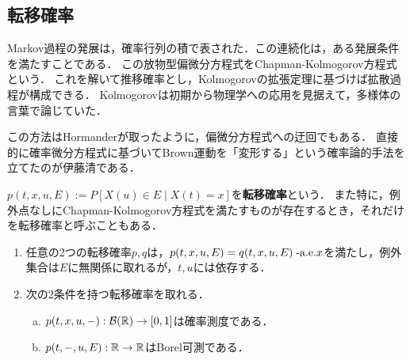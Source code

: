 \documentclass[uplatex,dvipdfmx]{jsreport}
\begin{document}
\subsection{転移確率}

\begin{tcolorbox}[colframe=ForestGreen, colback=ForestGreen!10!white,breakable,colbacktitle=ForestGreen!40!white,coltitle=black,fonttitle=\bfseries\sffamily,
title=熱核の半群性]
    Markov過程の発展は，確率行列の積で表された．この連続化は，ある発展条件を満たすことである．
    この放物型偏微分方程式をChapman-Kolmogorov方程式という．
    これを解いて推移確率とし，Kolmogorovの拡張定理に基づけば拡散過程が構成できる．
    Kolmogorovは初期から物理学への応用を見据えて，多様体の言葉で論じていた．

    この方法はHormanderが取ったように，偏微分方程式への迂回でもある．
    直接的に確率微分方程式に基づいてBrown運動を「変形する」という確率論的手法を立てたのが伊藤清である．
\end{tcolorbox}

\begin{definition}
    $p(t,x,u,E):=P[X(u)\in E\mid X(t)=x]$を\textbf{転移確率}という．
    また特に，例外点なしにChapman-Kolmogorov方程式を満たすものが存在するとき，それだけを転移確率と呼ぶこともある．
\end{definition}

\begin{lemma}\mbox{}
    \begin{enumerate}
        \item 任意の2つの転移確率$p,q$は，$p(t,x,u,E)=q(t,x,u,E)\;\text{-a.e.} x$を満たし，例外集合は$E$に無関係に取れるが，$t,u$には依存する．
        \item
    次の2条件を持つ転移確率を取れる．
    \begin{enumerate}[(a)]
        \item $p(t,x,u,-):\mathcal{B}(\mathbb{R})\to[0,1]$は確率測度である．
        \item $p(t,-,u,E):\mathbb{R}\to\mathbb{R}$はBorel可測である．
    \end{enumerate}
    \end{enumerate}
\end{lemma}
\end{document}
